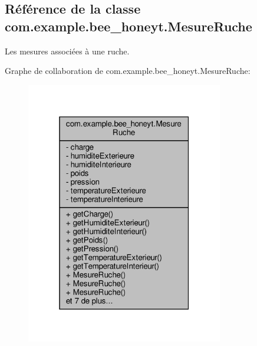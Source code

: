 \hypertarget{classcom_1_1example_1_1bee__honeyt_1_1_mesure_ruche}{}\subsection{Référence de la classe com.\+example.\+bee\+\_\+honeyt.\+Mesure\+Ruche}
\label{classcom_1_1example_1_1bee__honeyt_1_1_mesure_ruche}


Les mesures associées à une ruche.  




Graphe de collaboration de com.\+example.\+bee\+\_\+honeyt.\+Mesure\+Ruche\+:\nopagebreak
\begin{figure}[H]
\begin{center}
\leavevmode
\includegraphics[width=244pt]{classcom_1_1example_1_1bee__honeyt_1_1_mesure_ruche__coll__graph}
\end{center}
\end{figure}
